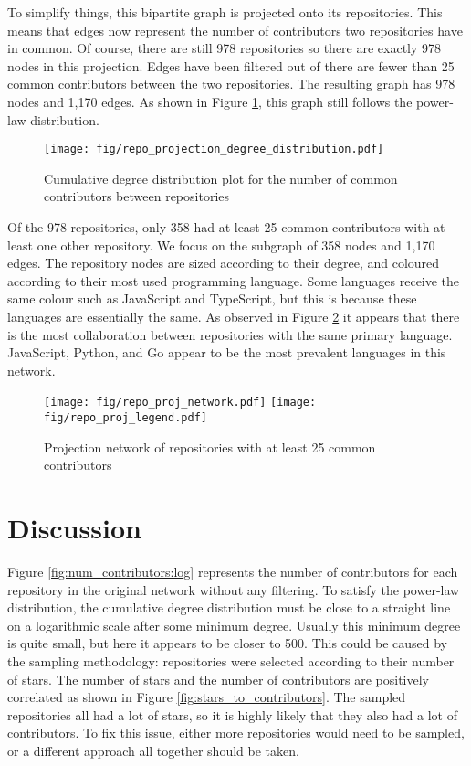 \documentclass[11pt]{article}
\begin{document}
To simplify things, this bipartite graph is projected onto its repositories. This means that edges now represent the number of contributors two repositories have in common. Of course, there are still 978 repositories so there are exactly 978 nodes in this projection. Edges have been filtered out of there are fewer than 25 common contributors between the two repositories. The resulting graph has 978 nodes and 1,170 edges. As shown in Figure \ref{fig:repo_projection_degree_distribution}, this graph still follows the power-law distribution.

\begin{figure}
  \centering
  \texttt{[image: fig/repo\_projection\_degree\_distribution.pdf]}
  \caption{Cumulative degree distribution plot for the number of common contributors between repositories}
  \label{fig:repo_projection_degree_distribution}
\end{figure}

Of the 978 repositories, only 358 had at least 25 common contributors with at least one other repository. We focus on the subgraph of 358 nodes and 1,170 edges. The repository nodes are sized according to their degree, and coloured according to their most used programming language. Some languages receive the same colour such as JavaScript and TypeScript, but this is because these languages are essentially the same. As observed in Figure \ref{fig:repo_proj} it appears that there is the most collaboration between repositories with the same primary language. JavaScript, Python, and Go appear to be the most prevalent languages in this network.

\begin{figure}
  \centering
  \texttt{[image: fig/repo\_proj\_network.pdf]}
  \texttt{[image: fig/repo\_proj\_legend.pdf]}
  \caption{Projection network of repositories with at least 25 common contributors}
  \label{fig:repo_proj}
\end{figure}





\section{Discussion}
\label{sec:discussion}
Figure \ref{fig:num_contributors:log} represents the number of contributors for each repository in the original network without any filtering. To satisfy the power-law distribution, the cumulative degree distribution must be close to a straight line on a logarithmic scale after some minimum degree. Usually this minimum degree is quite small, but here it appears to be closer to 500. This could be caused by the sampling methodology: repositories were selected according to their number of stars. The number of stars and the number of contributors are positively correlated as shown in Figure \ref{fig:stars_to_contributors}. The sampled repositories all had a lot of stars, so it is highly likely that they also had a lot of contributors. To fix this issue, either more repositories would need to be sampled, or a different approach all together should be taken.
\end{document}
